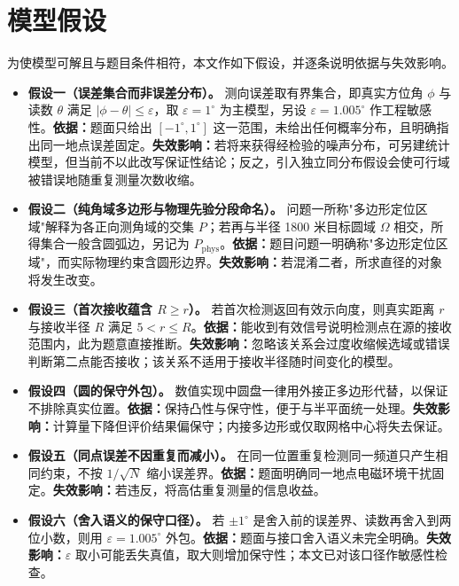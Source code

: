 \section{模型假设}

为使模型可解且与题目条件相符，本文作如下假设，并逐条说明依据与失效影响。

\begin{itemize}[label=\textbullet,leftmargin=2em]
  \item \textbf{假设一（误差集合而非误差分布）。} 测向误差取有界集合，即真实方位角 $\phi$ 与读数 $\theta$ 满足 $\lvert\phi-\theta\rvert\le\varepsilon$，取 $\varepsilon=1^\circ$ 为主模型，另设 $\varepsilon=1.005^\circ$ 作工程敏感性。\textbf{依据：}题面只给出 $[-1^\circ,1^\circ]$ 这一范围，未给出任何概率分布，且明确指出同一地点误差固定。\textbf{失效影响：}若将来获得经检验的噪声分布，可另建统计模型，但当前不以此改写保证性结论；反之，引入独立同分布假设会使可行域被错误地随重复测量次数收缩。

  \item \textbf{假设二（纯角域多边形与物理先验分段命名）。} 问题一所称"多边形定位区域"解释为各正向测角域的交集 $P$；若再与半径 1800 米目标圆域 $\Omega$ 相交，所得集合一般含圆弧边，另记为 $P_{\text{phys}}$。\textbf{依据：}题目问题一明确称"多边形定位区域"，而实际物理约束含圆形边界。\textbf{失效影响：}若混淆二者，所求直径的对象将发生改变。

  \item \textbf{假设三（首次接收蕴含 $R\ge r$）。} 若首次检测返回有效示向度，则真实距离 $r$ 与接收半径 $R$ 满足 $5<r\le R$。\textbf{依据：}能收到有效信号说明检测点在源的接收范围内，此为题意直接推断。\textbf{失效影响：}忽略该关系会过度收缩候选域或错误判断第二点能否接收；该关系不适用于接收半径随时间变化的模型。

  \item \textbf{假设四（圆的保守外包）。} 数值实现中圆盘一律用外接正多边形代替，以保证不排除真实位置。\textbf{依据：}保持凸性与保守性，便于与半平面统一处理。\textbf{失效影响：}计算量下降但评价结果偏保守；内接多边形或仅取网格中心将失去保证。

  \item \textbf{假设五（同点误差不因重复而减小）。} 在同一位置重复检测同一频道只产生相同约束，不按 $1/\sqrt{N}$ 缩小误差界。\textbf{依据：}题面明确同一地点电磁环境干扰固定。\textbf{失效影响：}若违反，将高估重复测量的信息收益。

  \item \textbf{假设六（舍入语义的保守口径）。} 若 $\pm1^\circ$ 是舍入前的误差界、读数再舍入到两位小数，则用 $\varepsilon=1.005^\circ$ 外包。\textbf{依据：}题面与接口舍入语义未完全明确。\textbf{失效影响：}$\varepsilon$ 取小可能丢失真值，取大则增加保守性；本文已对该口径作敏感性检查。


\end{itemize}

